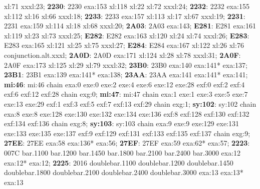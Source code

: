 xl:71 xxxl:23; \textbf{2230}: 2230 exa:153 xl:118 xl:22 xl:72 xxxl:24;
\textbf{2232}: 2232 exa:155 xl:112 xl:16 xl:66 xxxl:18; \textbf{2233}: 2233
exa:157 xl:113 xl:17 xl:67 xxxl:19; \textbf{2231}: 2231 exa:159 xl:114 xl:18
xl:68 xxxl:20; \textbf{2A03}: 2A03 exa:143; \textbf{E281}: E281 exa:161 xl:119
xl:23 xl:73 xxxl:25; \textbf{E282}: E282 exa:163 xl:120 xl:24 xl:74 xxxl:26;
\textbf{E283}: E283 exa:165 xl:121 xl:25 xl:75 xxxl:27; \textbf{E284}: E284
exa:167 xl:122 xl:26 xl:76 conjunction.alt.xxxl; \textbf{2A0D}: 2A0D exa:171
xl:124 xl:28 xl:78 xxxl:31; \textbf{2A0F}: 2A0F exa:173 xl:125 xl:29 xl:79
xxxl:32; \textbf{23B0}: 23B0 \textbar{} exa:140 exa:141* exa:137;
\textbf{23B1}: 23B1 \textbar{} exa:139 exa:141* exa:138; \textbf{23AA}: 23AA
\textbar{} exa:141 exa:141* exa:141; \textbf{mi:46}: mi:46 chain exa:0 exe:0
exe:2 exe:4 exe:6 exe:12 exe:28 exf:0 exf:2 exf:4 exf:6 exf:12 exf:28 chain
exg:0; \textbf{mi:47}: mi:47 chain exa:1 exe:1 exe:3 exe:5 exe:7 exe:13 exe:29
exf:1 exf:3 exf:5 exf:7 exf:13 exf:29 chain exg:1; \textbf{sy:102}: sy:102
chain exa:8 exe:8 exe:128 exe:130 exe:132 exe:134 exe:136 exf:8 exf:128 exf:130
exf:132 exf:134 exf:136 chain exg:8; \textbf{sy:103}: sy:103 chain exa:9 exe:9
exe:129 exe:131 exe:133 exe:135 exe:137 exf:9 exf:129 exf:131 exf:133 exf:135
exf:137 chain exg:9; \textbf{27EE}: 27EE \textbar{} exa:58 exa:136* exa:56;
\textbf{27EF}: 27EF \textbar{} exa:59 exa:62* exa:57; \textbf{2223}: 007C
bar.1100 bar.1200 bar.1450 bar.1800 bar.2100 bar.2400 bar.3000 \textbar{}
exa:12 exa:12* exa:12; \textbf{2225}: 2016 doublebar.1100 doublebar.1200
doublebar.1450 doublebar.1800 doublebar.2100 doublebar.2400 doublebar.3000
\textbar{} exa:13 exa:13* exa:13\par

